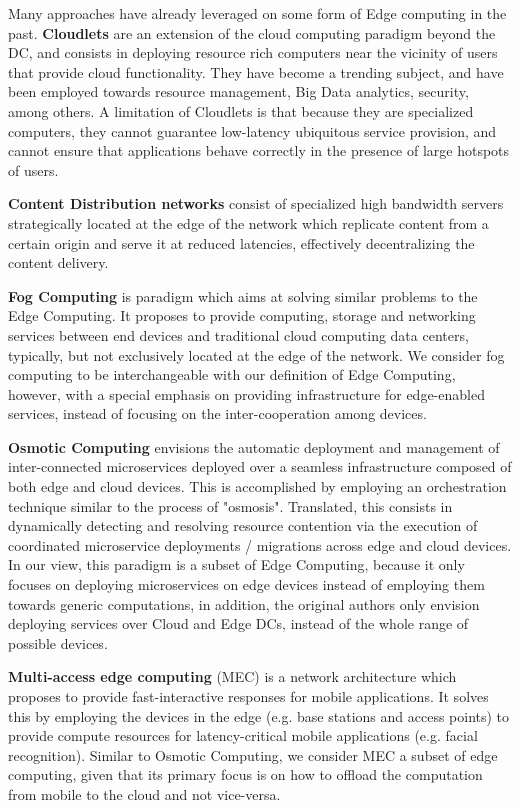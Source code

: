 Many approaches have already leveraged on some form of Edge computing in the past. \textbf{Cloudlets} \cite{10.1145/2307849.2307858} are an extension of the cloud computing paradigm beyond the DC, and consists in deploying resource rich computers near the vicinity of users that provide cloud functionality. They have become a trending subject, and have been employed towards resource management, Big Data analytics, security, among others. A limitation of Cloudlets is that because they are specialized computers, they cannot guarantee low-latency ubiquitous service provision, and cannot ensure that applications behave correctly in the presence of large hotspots of users.  

\textbf{Content Distribution networks} \cite{peng2004cdn} consist of specialized high bandwidth servers strategically located at the edge of the network which replicate content from a certain origin and serve it at reduced latencies, effectively decentralizing the content delivery. 

\textbf{Fog Computing} \cite{bonomi2012fog} is paradigm which aims at solving similar problems to the Edge Computing. It proposes to provide computing, storage and networking services between end devices and traditional cloud computing data centers, typically, but not exclusively located at the edge of the network. We consider fog computing to be interchangeable with our definition of Edge Computing, however, with a special emphasis on providing infrastructure for edge-enabled services, instead of focusing on the inter-cooperation among devices.

\textbf{Osmotic Computing} \cite{villari2016osmotic} envisions the automatic deployment and management of inter-connected microservices deployed over a seamless infrastructure composed of both edge and cloud devices. This is accomplished by employing an orchestration technique similar to the process of "osmosis". Translated, this consists in dynamically detecting and resolving resource contention via the execution of coordinated microservice deployments / migrations across edge and cloud devices. In our view, this paradigm is a subset of Edge Computing, because it only focuses on deploying microservices on edge devices instead of employing them towards generic computations, in addition, the original authors only envision deploying services over Cloud and Edge DCs, instead of the whole range of possible devices.

\textbf{Multi-access edge computing} \cite{mobile_edge_cloud} (MEC) is a network architecture which proposes to provide fast-interactive responses for mobile applications. It solves this by employing the devices in the edge (e.g. base stations and access points) to provide compute resources for latency-critical mobile applications (e.g. facial recognition). Similar to Osmotic Computing, we consider MEC a subset of edge computing, given that its primary focus is on how to offload the computation from mobile to the cloud and not vice-versa. 

